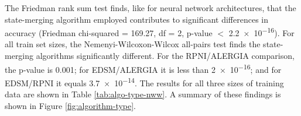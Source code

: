 \documentclass[twoside,11pt]{article}
\newcommand{\ttt}[1]{\texttt{#1}}
\newcommand{\tbf}[1]{\textbf{#1}}
\newcommand{\tttx}[1]{\ttt{#1}\xspace}
\newcommand{\TrainSize}{\tttx{TrainSize}}
\newcommand{\AlgoType}{\tttx{AlgoType}}
\begin{document}
The Friedman rank sum test finds, like for neural network architectures, that the state-merging algorithm employed contributes to significant differences in accuracy (Friedman chi-squared = 169.27, df = 2, p-value $<$ \num{2.2e-16}).  For all train set sizes, the Nemenyi-Wilcoxon-Wilcox all-pairs test finds the state-merging algorithms significantly different. For the RPNI/ALERGIA comparison, the p-value is 0.001; for EDSM/ALERGIA it is less than \num{2e-16}; and for EDSM/RPNI it equals \num{3.7e-14}. The results for all three sizes of training data are shown in Table \ref{tab:algo-type-nww}. A summary of these findings is shown in Figure \ref{fig:algorithm-type}.

\end{document}
